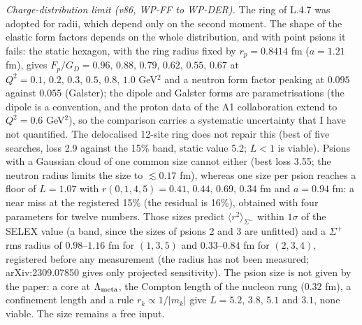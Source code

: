 \documentclass[11pt,letterpaper]{article}
\begin{document}
\noindent \emph{Charge-distribution limit (v86, WP-FF to WP-DER).} The ring of L.4.7 was adopted for radii, which depend only on the second moment. The shape of the elastic form factors depends on the whole distribution, and with point psions it fails: the static hexagon, with the ring radius fixed by $r_p=0.8414$ fm ($a=1.21$ fm), gives $F_p/G_D=0.96,\,0.88,\,0.79,\,0.62,\,0.55,\,0.67$ at $Q^2=0.1,\,0.2,\,0.3,\,0.5,\,0.8,\,1.0$ GeV$^2$ and a neutron form factor peaking at $0.095$ against $0.055$ (Galster); the dipole and Galster forms are parametrisations (the dipole is a convention, and the proton data of the A1 collaboration extend to $Q^2=0.6$ GeV$^2$), so the comparison carries a systematic uncertainty that I have not quantified. The delocalised 12-site ring does not repair this (best of five searches, loss 2.9 against the 15\% band, static value 5.2; $L<1$ is viable). Psions with a Gaussian cloud of one common size cannot either (best loss 3.55; the neutron radius limits the size to $\lesssim0.17$ fm), whereas one size per psion reaches a floor of $L=1.07$ with $r(0,1,4,5)=0.41,\,0.44,\,0.69,\,0.34$ fm and $a=0.94$ fm: a near miss at the registered 15\% (the residual is 16\%), obtained with four parameters for twelve numbers. Those sizes predict $\langle r^2\rangle_{\Sigma^-}$ within $1\sigma$ of the SELEX value (a band, since the sizes of psions 2 and 3 are unfitted) and a $\Sigma^+$ rms radius of $0.98$--$1.16$ fm for $(1,3,5)$ and $0.33$--$0.84$ fm for $(2,3,4)$, registered before any measurement (the radius has not been measured; arXiv:2309.07850 gives only projected sensitivity). The psion size is not given by the paper: a core at $\Lambda_{\rm meta}$, the Compton length of the nucleon rung ($0.32$ fm), a confinement length and a rule $r_k\propto1/|m_k|$ give $L=5.2,\,3.8,\,5.1$ and $3.1$, none viable. The size remains a free input.
\end{document}
